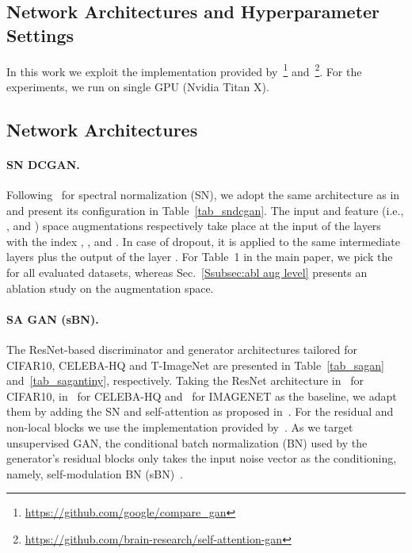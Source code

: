 \documentclass{article}
\begin{document}
\begin{center}
 \section{Network Architectures and Hyperparameter Settings}\label{sec:networks}
In this work we exploit the implementation provided by~\cite{LucicEqualGANs, Kurach2018GANlandscape}\footnote{\url{https://github.com/google/compare_gan}} and~\cite{Zhang_SAGAN18}\footnote{\url{https://github.com/brain-research/self-attention-gan}}. For the experiments, we run on single GPU (Nvidia Titan X).
\subsection{Network Architectures}\label{subsec:netarch}



\paragraph{SN DCGAN.}\label{subsec:sndcgan}
Following~\cite{miyato2018spectral} for spectral normalization (SN), we adopt the same architecture as in~\cite{Kurach2018GANlandscape} and present its configuration in Table~\ref{tab_sndcgan}. The input and feature (i.e., ,  and ) space augmentations respectively take place at the input of the layers with the index , ,  and . In case of dropout, it is applied to the same intermediate layers plus the output of the layer . For Table~1 in the main paper, we pick the   for all evaluated datasets, whereas Sec.~\ref{Ssubsec:abl aug level} presents an ablation study on the augmentation space.

\paragraph{SA GAN (sBN).}\label{subsec:sagan}
The ResNet-based discriminator and generator architectures tailored for CIFAR10, CELEBA-HQ and T-ImageNet are presented in Table~\ref{tab_sagan} and~\ref{tab_sagantiny}, respectively. Taking the ResNet architecture in~\cite{gulrajani_NIPS2017} for CIFAR10, in~\cite{Kurach2018GANlandscape} for CELEBA-HQ and~\cite{Brock2019} for IMAGENET as the baseline, we adapt them by adding the SN and self-attention as proposed in~\cite{Zhang_SAGAN18}. For the residual and non-local blocks we use the implementation provided by~\cite{Zhang_SAGAN18}. As we target unsupervised GAN, the conditional batch normalization (BN) used by the generator's residual blocks only takes the input noise vector  as the conditioning, namely, self-modulation BN (sBN)~\cite{chen2018on}.


\end{center}
\end{document}
